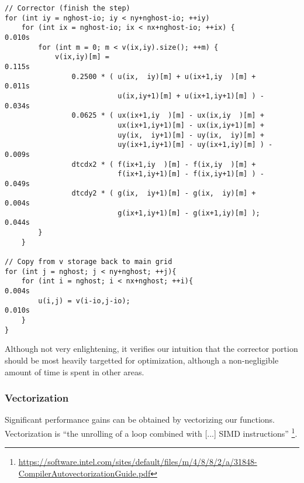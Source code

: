 \begin{lstlisting}
// Corrector (finish the step)                                                                      
for (int iy = nghost-io; iy < ny+nghost-io; ++iy)                                                   
    for (int ix = nghost-io; ix < nx+nghost-io; ++ix) {             0.010s 
        for (int m = 0; m < v(ix,iy).size(); ++m) {                                                 
            v(ix,iy)[m] =                                           0.115s
                0.2500 * ( u(ix,  iy)[m] + u(ix+1,iy  )[m] +        0.011s 
                           u(ix,iy+1)[m] + u(ix+1,iy+1)[m] ) -      0.034s 
                0.0625 * ( ux(ix+1,iy  )[m] - ux(ix,iy  )[m] +                                      
                           ux(ix+1,iy+1)[m] - ux(ix,iy+1)[m] +                                      
                           uy(ix,  iy+1)[m] - uy(ix,  iy)[m] +                                      
                           uy(ix+1,iy+1)[m] - uy(ix+1,iy)[m] ) -    0.009s
                dtcdx2 * ( f(ix+1,iy  )[m] - f(ix,iy  )[m] +                                        
                           f(ix+1,iy+1)[m] - f(ix,iy+1)[m] ) -      0.049s
                dtcdy2 * ( g(ix,  iy+1)[m] - g(ix,  iy)[m] +        0.004s
                           g(ix+1,iy+1)[m] - g(ix+1,iy)[m] );       0.044s 
        }                                                                                           
    }                                                                                               
                                                                                                    
// Copy from v storage back to main grid                                                            
for (int j = nghost; j < ny+nghost; ++j){                                                           
    for (int i = nghost; i < nx+nghost; ++i){                       0.004s
        u(i,j) = v(i-io,j-io);                                      0.010s
    }                                                                                                          
} 
\end{lstlisting}

Although not very enlightening, it verifies our intuition that the corrector
portion should be most heavily targetted for optimization, although a 
non-negligible amount of time is spent in other areas.

\subsubsection{Vectorization}
\label{sec-profile-vectorization}
Significant performance gains can be obtained by vectorizing our functions.
Vectorization is ``the unrolling of a loop combined with [...] SIMD instructions''
\footnote{\url{https://software.intel.com/sites/default/files/m/4/8/8/2/a/31848-CompilerAutovectorizationGuide.pdf}}.

